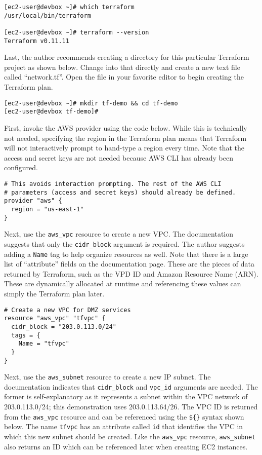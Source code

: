 \begin{verbatim}
[ec2-user@devbox ~]# which terraform
/usr/local/bin/terraform

[ec2-user@devbox ~]# terraform --version
Terraform v0.11.11
\end{verbatim}

Last, the author recommends creating a directory for this particular Terraform
project as shown below. Change into that directly and create a new text file
called ``network.tf''. Open the file in your favorite editor to begin creating
the Terraform plan.

\begin{verbatim}
[ec2-user@devbox ~]# mkdir tf-demo && cd tf-demo
[ec2-user@devbox tf-demo]#
\end{verbatim}

First, invoke the AWS provider using the code below. While this is technically
not needed, specifying the region in the Terraform plan means that Terraform
will not interactively prompt to hand-type a region every time. Note that the
access and secret keys are not needed because AWS CLI has already been configured.

\begin{verbatim}
# This avoids interaction prompting. The rest of the AWS CLI
# parameters (access and secret keys) should already be defined.
provider "aws" {
  region = "us-east-1"
}
\end{verbatim}

Next, use the \verb|aws_vpc| resource to create a new VPC\@. The documentation
suggests that only the \verb|cidr_block| argument is required. The author
suggests adding a \verb|Name| tag to help organize resources as well. Note
that there is a large list of ``attribute'' fields on the documentation page.
These are the pieces of data returned by Terraform, such as the VPD ID and
Amazon Resource Name (ARN). These are dynamically allocated at runtime and
referencing these values can simply the Terraform plan later.

\begin{verbatim}
# Create a new VPC for DMZ services
resource "aws_vpc" "tfvpc" {
  cidr_block = "203.0.113.0/24"
  tags = {
    Name = "tfvpc"
  }
}
\end{verbatim}

Next, use the \verb|aws_subnet| resource to create a new IP subnet. The
documentation indicates that \verb|cidr_block| and \verb|vpc_id| arguments are needed.
The former is self-explanatory as it represents a subnet within the VPC
network of 203.0.113.0/24; this demonstration uses 203.0.113.64/26. The VPC ID
is returned from the \verb|aws_vpc| resource and can be referenced using the \verb|${}|
syntax shown below. The name \verb|tfvpc| has an attribute called \verb|id| that
identifies the VPC in which this new subnet should be created. Like the
\verb|aws_vpc| resource, \verb|aws_subnet| also returns an ID which can be referenced
later when creating EC2 instances.

